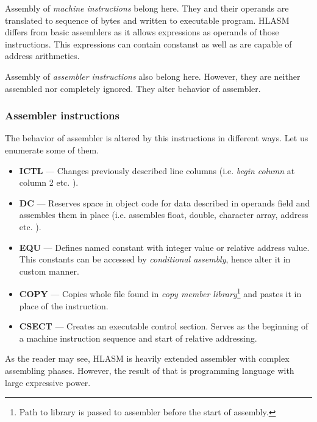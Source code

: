 Assembly of \textit{machine instructions} belong here. They and their operands are translated to sequence of bytes and written to executable program. HL\-ASM differs from basic assemblers as it allows expressions as operands of those instructions. This expressions can contain constanst as well as are capable of address arithmetics.

Assembly of \textit{assembler instructions} also belong here. However, they are neither assembled nor completely ignored. They alter behavior of assembler.

\subsubsection{Assembler instructions}
The behavior of assembler is altered by this instructions in different ways. Let us enumerate some of them.
 
\begin{itemize}
	\item \textbf{ICTL} --- Changes previously described line columns (i.e. \textit{begin column} at column 2 etc. ).
	
	\item \textbf{DC} --- Reserves space in object code for data described in operands field and assembles them in place (i.e. assembles float, double, character array, address etc. ).
	
	\item \textbf{EQU} --- Defines named constant with integer value or relative address value. This constants can be accessed by \textit{conditional assembly}, hence alter it in custom manner.
	
	\item \textbf{COPY} --- Copies whole file found in \textit{copy member library}\footnote{Path to library is passed to assembler before the start of assembly.} and pastes it in place of the instruction.
	
	\item \textbf{CSECT} --- Creates an executable control section. Serves as the beginning of a machine instruction sequence and start of relative addressing.
\end{itemize}



As the reader may see, HLASM is heavily extended assembler with complex assembling phases. 
However, the result of that is programming language with large expressive power. 